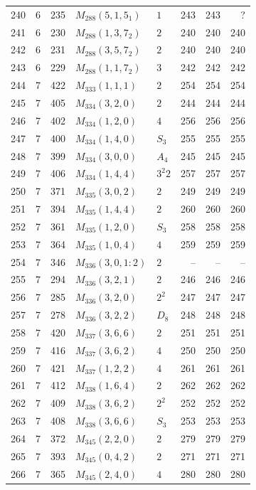\documentclass[11pt,a4paper]{article}
\begin{document}
\begin{longtable}{rrr|l|l|rrr}
240 & 6 & 235 & $M_{288}(5,1,5_1)$ & $1$ & 243 & 243 & ?\\
241 & 6 & 230 & $M_{288}(1,3,7_2)$ & $2$ & 240 & 240 & 240\\
242 & 6 & 231 & $M_{288}(3,5,7_2)$ & $2$ & 240 & 240 & 240\\
243 & 6 & 229 & $M_{288}(1,1,7_2)$ & $3$ & 242 & 242 & 242\\
244 & 7 & 422 & $M_{333}(1,1,1)$ & $2$ & 254 & 254 & 254\\
245 & 7 & 405 & $M_{334}(3,2,0)$ & $2$ & 244 & 244 & 244\\
246 & 7 & 402 & $M_{334}(1,2,0)$ & $4$ & 256 & 256 & 256\\
247 & 7 & 400 & $M_{334}(1,4,0)$ & $S_3$ & 255 & 255 & 255\\
248 & 7 & 399 & $M_{334}(3,0,0)$ & $A_4$ & 245 & 245 & 245\\
249 & 7 & 406 & $M_{334}(1,4,4)$ & $3^2 2$ & 257 & 257 & 257\\
250 & 7 & 371 & $M_{335}(3,0,2)$ & $2$ & 249 & 249 & 249\\
251 & 7 & 394 & $M_{335}(1,4,4)$ & $2$ & 260 & 260 & 260\\
252 & 7 & 361 & $M_{335}(1,2,0)$ & $S_3$ & 258 & 258 & 258\\
253 & 7 & 364 & $M_{335}(1,0,4)$ & $4$ & 259 & 259 & 259\\
254 & 7 & 346 & $M_{336}(3,0,1:2)$ & $2$ & -- & -- & --\\
255 & 7 & 294 & $M_{336}(3,2,1)$ & $2$ & 246 & 246 & 246\\
256 & 7 & 285 & $M_{336}(3,2,0)$ & $2^2$ & 247 & 247 & 247\\
257 & 7 & 278 & $M_{336}(3,2,2)$ & $D_8$ & 248 & 248 & 248\\
258 & 7 & 420 & $M_{337}(3,6,6)$ & $2$ & 251 & 251 & 251\\
259 & 7 & 416 & $M_{337}(3,6,2)$ & $4$ & 250 & 250 & 250\\
260 & 7 & 421 & $M_{337}(1,2,2)$ & $4$ & 261 & 261 & 261\\
261 & 7 & 412 & $M_{338}(1,6,4)$ & $2$ & 262 & 262 & 262\\
262 & 7 & 409 & $M_{338}(3,6,2)$ & $2^2$ & 252 & 252 & 252\\
263 & 7 & 408 & $M_{338}(3,6,6)$ & $S_3$ & 253 & 253 & 253\\
264 & 7 & 372 & $M_{345}(2,2,0)$ & $2$ & 279 & 279 & 279\\
265 & 7 & 393 & $M_{345}(0,4,2)$ & $2$ & 271 & 271 & 271\\
266 & 7 & 365 & $M_{345}(2,4,0)$ & $4$ & 280 & 280 & 280\\

\end{longtable}
\end{document}
